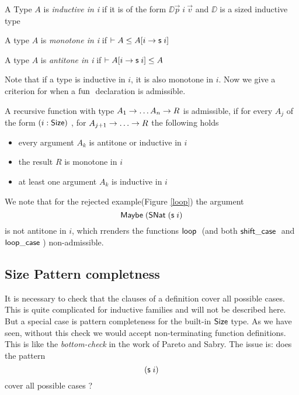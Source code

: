 \begin{definition}
A Type $A$ is \emph{inductive in i} if it is of the form $ \DD \vec{p} \; i \: \vec{v} $ and $\DD$ is a sized inductive type
\end{definition}
\begin{definition}
A type $A$ is \emph{monotone in i} if $ \vdash A\leq A[i \rightarrow \mathsf{s}\; i ]$ 
\end{definition}
\begin{definition}
A type $A$ is \emph{antitone in i} if $ \vdash A[i \rightarrow \mathsf{s}\; i ]\leq A$ 
\end{definition}
Note that if a type is inductive in $i$, it is also monotone in $i$. 
Now we give a criterion for when a $\mathrm{fun}\;$ declaration is admissible.
\begin{definition}
A recursive function with type $ A_1 \rightarrow \dots A_n \rightarrow R $ is admissible, if
for every $A_j$ of the form $(i : \mathsf{Size} )$ , for $A_{j + 1} \ra \dots \ra R $ the following holds 
\begin{itemize}
\item
every argument $A_k$ is antitone or inductive in $i$
\item
the result $R$ is monotone in $i$  
\item
at least one argument $A_k$ is inductive in $i$
\end{itemize}
\end{definition}
We note that for the rejected example(Figure \ref{loop}) the argument \[\mathsf{Maybe}\; (\mathsf{SNat}\; (\mathsf{s}\; i)\] is not antitone in $i$, which rrenders the functions $\mathsf{loop}\;$ (and both $ \mathsf{shift\_case}\;$ and $\mathsf{loop\_case}\;$) non-admissible.

\subsection{Size Pattern completness}
It is necessary to check that the clauses of a definition cover all possible cases.
This is quite complicated for inductive families and will not be described here.
But a special case is pattern completeness for the built-in $\mathsf{Size}$ type.
As we have seen, without this check we would accept non-terminating function definitions.
This is like the \emph{bottom-check} in the work of Pareto and Sabry.
The issue is: does the pattern \[ (\mathsf{s}\; i) \] cover all possible cases ? 

